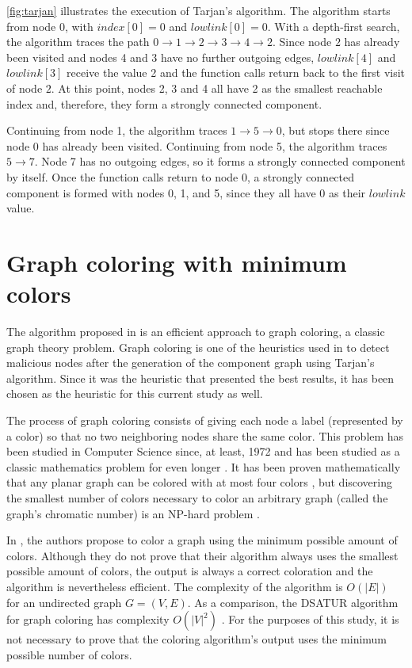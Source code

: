\autoref{fig:tarjan} illustrates the execution of Tarjan's algorithm.
The algorithm starts from node 0, with $index[0] = 0$ and $lowlink[0] = 0$.
With a depth-first search, the algorithm traces the path $0 \rightarrow 1 \rightarrow 2 \rightarrow 3 
\rightarrow 4 \rightarrow 2$.
Since node $2$ has already been visited and nodes 4 and 3 have no further outgoing edges, $lowlink[4]$ and $lowlink[3]$ receive the value 2 and the function calls return back to the first visit of node $2$.
At this point, nodes 2, 3 and 4 all have 2 as the smallest reachable index and, therefore, they form a strongly connected component.

Continuing from node 1, the algorithm traces $1 \rightarrow 5 \rightarrow 0$, but stops there since node 0 has already been visited.
Continuing from node 5, the algorithm traces $5 \rightarrow 7$.
Node 7 has no outgoing edges, so it forms a strongly connected component by itself.
Once the function calls return to node 0, a strongly connected component is formed with nodes 0, 1, and 5, since they all have 0 as their $lowlink$ value.

\section{Graph coloring with minimum colors}
\label{section:coloring}
The algorithm proposed in \cite{mittal2011graph} is an efficient approach to graph coloring, a classic graph theory problem.
Graph coloring is one of the heuristics used in \cite{vernize2013dissertation} to detect malicious nodes after the generation of the component graph using Tarjan's algorithm.
Since it was the heuristic that presented the best results, it has been chosen as the heuristic for this current study as well.

The process of graph coloring consists of giving each node a label (represented by a color) so that no two neighboring nodes share the same color.
This problem has been studied in Computer Science since, at least, 1972 \cite{karp1972reducibility} and has been studied as a classic mathematics problem for even longer \cite{kempe1879geographical}.
It has been proven mathematically that any planar graph can be colored with at most four colors \cite{appel1976every}, but discovering the smallest number of colors necessary to color an arbitrary graph (called the graph's chromatic number) is an NP-hard problem \cite{sanchez1989determining}.

In \cite{mittal2011graph}, the authors propose to color a graph using the minimum possible amount of colors.
Although they do not prove that their algorithm always uses the smallest possible amount of colors, the output is always a correct coloration and the algorithm is nevertheless efficient.
The complexity of the algorithm is $O(|E|)$ for an undirected graph $G = (V,E)$.
As a comparison, the DSATUR algorithm for graph coloring has complexity $O(|V|^2)$ \cite{brelaz1979new}.
For the purposes of this study, it is not necessary to prove that the coloring algorithm's output uses the minimum possible number of colors.

